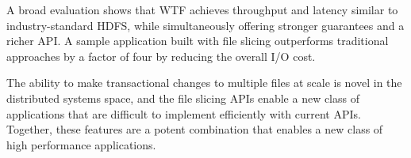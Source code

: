 \documentclass[twocolumn,10pt,letterpaper]{article}
\begin{document}
A broad evaluation shows that WTF achieves throughput and latency similar to
industry-standard HDFS, while simultaneously offering stronger guarantees and a
richer API.  A sample application built with file slicing outperforms
traditional approaches by a factor of four by reducing the overall I/O cost.

The ability to make transactional changes to multiple files at scale is novel in
the distributed systems space, and the file slicing APIs enable a new class of
applications that are difficult to implement efficiently with current APIs.
Together, these features are a potent combination that enables a new class of
high performance applications.



\end{document}
